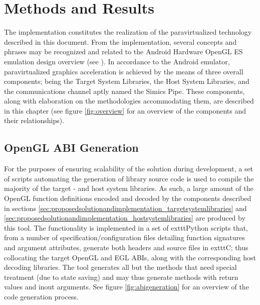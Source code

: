 
\section{Methods and Results}
\label{sec:methodsandresults}

The implementation constitutes the realization of the paravirtualized technology described in this document.
From the implementation, several concepts and phrases may be recognized and related to the Android Hardware OpenGL ES emulation design overview (see ).
In accordance to the Android emulator, paravirtualized graphics acceleration is achieved by the means of three overall components; being the Target System Libraries, the Host System Libraries, and the communications channel aptly named the Simics Pipe.
These components, along with elaboration on the methodologies accommodating them, are described in this chapter (see figure \ref{fig:overview} for an overview of the components and their relationships).

\subsection{OpenGL ABI Generation}
\label{sec:proposedsolutionandimplementation_openglabigeneration}
For the purposes of ensuring scalability of the solution during development, a set of scripts automating the generation of library source code is used to compile the majority of the target - and host system libraries.
As such, a large amount of the OpenGL function definitions encoded and decoded by the components described in sections \ref{sec:proposedsolutionandimplementation_targetsystemlibraries} and \ref{sec:proposedsolutionandimplementation_hostsystemlibraries} are produced by this tool.
The functionality is implemented in a set of 	exttt{Python} scripts that, from a number of specification/configuration files detailing function signatures and argument attributes, generate both headers and source files in 	exttt{C}; thus collocating the target OpenGL and EGL ABIs, along with the corresponding host decoding libraries.
The tool generates all but the methods that need special treatment (due to state saving) and may thus generate methods with return values and inout arguments.
See figure \ref{fig:abigeneration} for an overview of the code generation process.

